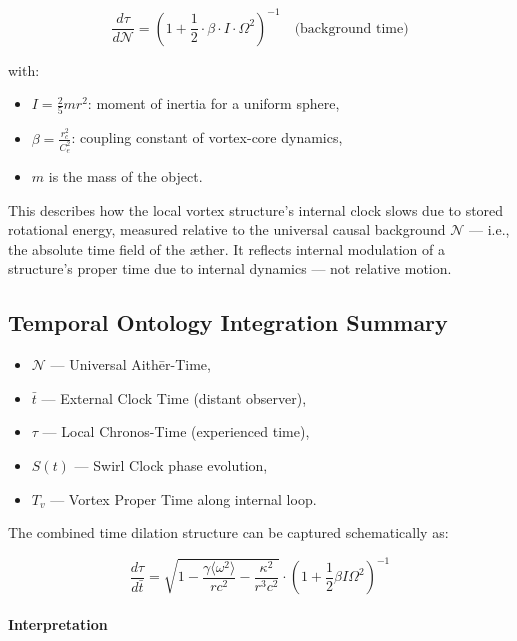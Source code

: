 \documentclass[preprint]{revtex4-2}
\begin{document}
\begin{equation}
   \frac{d\tau}{d\mathcal{N}} = \left(1 + \frac{1}{2} \cdot \beta \cdot I \cdot \Omega^2 \right)^{-1} \quad \text{(background time)}
\end{equation}

with:
\begin{itemize}
    \item \( I = \frac{2}{5} m r^2 \): moment of inertia for a uniform sphere,
    \item \( \beta = \frac{r_c^2}{C_e^2} \): coupling constant of vortex-core dynamics,
    \item \( m \) is the mass of the object.
\end{itemize}

This describes how the local vortex structure's internal clock slows due to stored rotational energy, measured relative to the universal causal background $\mathcal{N}$ — i.e., the absolute time field of the æther. It reflects internal modulation of a structure's proper time due to internal dynamics — not relative motion.


\subsection*{Temporal Ontology Integration Summary}

\begin{itemize}
    \item \( \mathcal{N} \) — Universal Aithēr-Time,
    \item \( \bar{t} \) — External Clock Time (distant observer),
    \item \( \tau \) — Local Chronos-Time (experienced time),
    \item \( S(t) \) — Swirl Clock phase evolution,
    \item \( T_v \) — Vortex Proper Time along internal loop.
\end{itemize}

The combined time dilation structure can be captured schematically as:

\begin{equation}
\boxed{
\frac{d\tau}{d\bar{t}} =
\sqrt{1 - \frac{\gamma \langle \omega^2 \rangle}{r c^2} - \frac{\kappa^2}{r^3 c^2}} \cdot
\left(1 + \frac{1}{2} \beta I \Omega^2 \right)^{-1}
}
\label{eq:VAM_combined_time_dilation}
\end{equation}


\paragraph{Interpretation}
\end{document}
